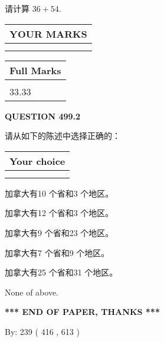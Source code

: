 \documentclass{ctexart}
\begin{document}
  
 
请计算 $ %
36 +  %
54 $.
 

 

 
  
\vspace{0.2in}
  
\noindent\begin{tabular}{|l|}
\hline
 YOUR MARKS  \\
\hline
 \\ 
 \\ 
\hline
\end{tabular}
\hspace{0.05in} \begin{tabular}{|l|}
\hline
 Full Marks  \\
\hline
 \\ 
33.33 \\
\hline
\end{tabular}
{\textbf{\Large{QUESTION
499.2 
}}}
  
  
请从如下的陈述中选择正确的：
  
  
\noindent\hspace{3.0in} \begin{tabular}{|l|}
\hline
Your choice \\
\hline
 \\ 
 \\ 
\hline
\end{tabular}
  
  
 
 
加拿大有10 个省和3 个地区。
 
 
加拿大有12 个省和3 个地区。
 
 
加拿大有9 个省和23 个地区。
 
 
加拿大有7 个省和9 个地区。
 
 
加拿大有25 个省和31 个地区。
 
 
 None of above.
 
 
   
   
 \vspace{0.2in}
 
   
   
   
   
\vspace{1.0in} 
{\textbf{\large{ *** END OF PAPER, THANKS *** }}} 
   
   
\hspace{1.0in} By: 
 239 ( 416 ,  613 )
   
\end{document}
